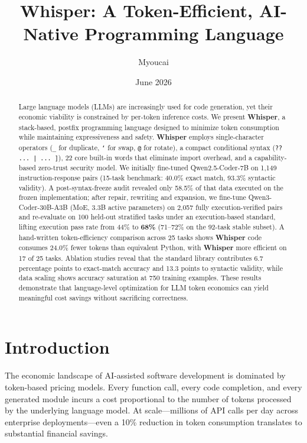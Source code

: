 \documentclass[11pt,a4paper]{article}
\title{\bfseries Whisper: A Token-Efficient, AI-Native Programming Language}
\author[1]{Myoucai}
\affil[1]{Independent Researcher}
\date{June 2026}
\begin{document}
\maketitle

\begin{abstract}
Large language models (LLMs) are increasingly used for code generation, yet their
economic viability is constrained by per-token inference costs. We present
\textbf{Whisper}, a stack-based, postfix programming language designed to
minimize token consumption while maintaining expressiveness and safety.
\textbf{Whisper} employs single-character operators (\texttt{\_} for duplicate,
\texttt{`} for swap, \texttt{@} for rotate), a compact conditional syntax
(\texttt{?? ... | ... ]}), 22 core built-in words that eliminate import
overhead, and a capability-based zero-trust security model. We initially
fine-tuned Qwen2.5-Coder-7B on 1,149 instruction-response pairs (15-task
benchmark: 40.0\% exact match, 93.3\% syntactic validity). A post-syntax-freeze
audit revealed only 58.5\% of that data executed on the frozen implementation;
after repair, rewriting and expansion, we fine-tune Qwen3-Coder-30B-A3B (MoE,
3.3B active parameters) on 2,057 fully execution-verified pairs and re-evaluate
on 100 held-out stratified tasks under an execution-based standard, lifting
execution pass rate from 44\% to \textbf{68\%} (71--72\% on the 92-task
stable subset).
A hand-written token-efficiency comparison across 25 tasks shows
\textbf{Whisper} code consumes 24.0\% fewer tokens than equivalent Python,
with \textbf{Whisper} more efficient on 17 of 25 tasks.
Ablation studies reveal that the standard library contributes
6.7 percentage points to exact-match accuracy and 13.3 points to syntactic
validity, while data scaling shows accuracy saturation at 750 training examples.
These results demonstrate that language-level optimization for LLM token
economics can yield meaningful cost savings without sacrificing correctness.
\end{abstract}

\section{Introduction}

The economic landscape of AI-assisted software development is dominated by
token-based pricing models. Every function call, every code completion, and
every generated module incurs a cost proportional to the number of tokens
processed by the underlying language model. At scale---millions of API calls
per day across enterprise deployments---even a 10\% reduction in token
consumption translates to substantial financial savings.
\end{document}
